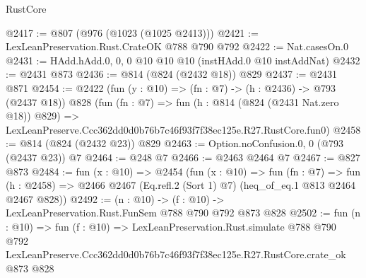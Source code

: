 \begin{lexlean}{RustCore}
\begin{coremodule}
@2417 := @807 (@976 (@1023 (@1025 @2413)))
@2421 := LexLeanPreservation.Rust.CrateOK @788 @790 @792
@2422 := Nat.casesOn.{0}
@2431 := HAdd.hAdd.{0, 0, 0} @10 @10 @10 (instHAdd.{0} @10 instAddNat)
@2432 := @2431 @873
@2436 := @814 (@824 (@2432 @18)) @829
@2437 := @2431 @871
@2454 := @2422
    (fun (y : @10) => (fn : @7) -> (h : @2436) -> @793 (@2437 @18))
    @828
    (fun (fn : @7) =>
    fun (h : @814 (@824 (@2431 Nat.zero @18)) @829) =>
    LexLeanPreserve.Ccc362dd0d0b76b7c46f93f7f38ec125e.R27.RustCore.fun0)
@2458 := @814 (@824 (@2432 @23)) @829
@2463 := Option.noConfusion.{0, 0} (@793 (@2437 @23)) @7
@2464 := @248 @7
@2466 := @2463 @2464 @7
@2467 := @827 @873
@2484 := fun (x : @10) =>
  @2454
    (fun (x : @10) =>
    fun (fn : @7) =>
    fun (h : @2458) => @2466 @2467 (Eq.refl.{2} (Sort 1) @7) (heq_of_eq.{1} @813 @2464 @2467 @828))
@2492 := (n : @10) -> (f : @10) -> LexLeanPreservation.Rust.FunSem @788 @790 @792 @873 @828
@2502 := fun (n : @10) =>
  fun (f : @10) =>
  LexLeanPreservation.Rust.simulate
    @788
    @790
    @792
    LexLeanPreserve.Ccc362dd0d0b76b7c46f93f7f38ec125e.R27.RustCore.crate_ok
    @873
    @828
\end{coremodule}
\end{lexlean}
